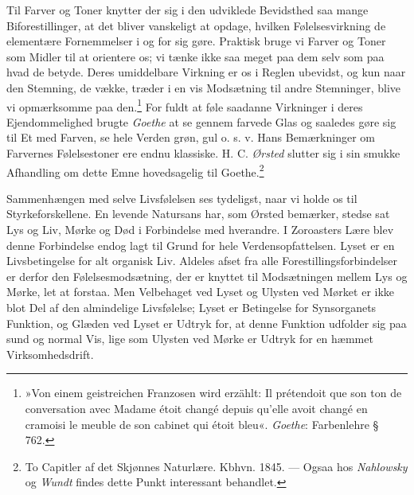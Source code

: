 \documentclass[12pt,a4paper,openany]{book}
\newcommand{\opage}[1]{\marginnote{\footnotesize\textit{[#1]}}}
\begin{document}
Til Farver og Toner knytter der sig i den udviklede Bevidsthed saa mange
Biforestillinger, at det bliver vanskeligt at opdage, hvilken
Følelsesvirkning de elementære Fornemmelser i og for sig gøre. Praktisk
bruge vi Farver og Toner som Midler til at orientere os; vi tænke ikke
saa meget paa dem selv som paa hvad de betyde. Deres umiddelbare
Virkning er os i Reglen ubevidst, og kun naar den Stemning, de vække,
træder i en vis Modsætning til andre Stemninger, blive vi opmærksomme
paa den.\footnote[1]{»Von einem geistreichen Franzosen wird erzählt: Il
prétendoit que son ton de conversation avec Madame étoit changé depuis
qu’elle avoit changé en cramoisi le meuble de son cabinet qui étoit
bleu«. \emph{Goethe}: Farbenlehre § 762.} For fuldt at føle saadanne
Virkninger i deres Ejendommelighed brugte \emph{Goethe} at se gennem
farvede Glas og saaledes gøre sig til Et med Farven, se hele Verden
grøn, gul o. s. v. Hans Bemærkninger om Farvernes Følelsestoner ere
endnu klassiske. H. C. \emph{Ørsted} slutter sig i sin smukke Afhandling
om dette Emne hovedsagelig til Goethe.\footnote[2]{To Capitler af det
Skjønnes Naturlære. Kbhvn. 1845. --- Ogsaa hos \emph{Nahlowsky} og
\emph{Wundt} findes dette Punkt interessant behandlet.}

Sammenhængen med selve Livsfølelsen ses tydeligst, naar vi holde os til
Styrkeforskellene. En levende Natursans har, som Ørsted bemærker, stedse
sat Lys og Liv, Mørke og Død i Forbindelse med hverandre. I Zoroasters
Lære blev denne Forbindelse endog lagt til Grund for hele
Verdensopfattelsen. Lyset er en Livsbetingelse for alt organisk Liv.
Aldeles afset fra alle Forestillingsforbindelser er derfor den
Følelsesmodsætning, der er knyttet til Modsætningen mellem Lys og Mørke,
\opage{278}let at forstaa. Men Velbehaget ved Lyset og Ulysten ved
Mørket er ikke blot Del af den almindelige Livsfølelse; Lyset er
Betingelse for Synsorganets Funktion, og Glæden ved Lyset er Udtryk for,
at denne Funktion udfolder sig paa sund og normal Vis, lige som Ulysten
ved Mørke er Udtryk for en hæmmet Virksomhedsdrift.
\end{document}
